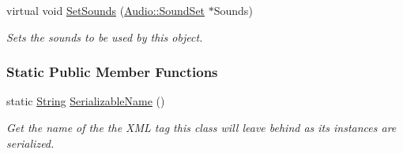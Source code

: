 \begin{DoxyCompactItemize}
virtual void \hyperlink{classMezzanine_1_1WorldObject_a0e117f3bb42577953439ad00e3a08cd3}{SetSounds} (\hyperlink{classMezzanine_1_1Audio_1_1SoundSet}{Audio::SoundSet} $\ast$Sounds)
\begin{DoxyCompactList}\small\item\em Sets the sounds to be used by this object. \item\end{DoxyCompactList}\end{DoxyCompactItemize}
\subsubsection*{Static Public Member Functions}
\begin{DoxyCompactItemize}
\item 
static \hyperlink{namespaceMezzanine_acf9fcc130e6ebf08e3d8491aebcf1c86}{String} \hyperlink{classMezzanine_1_1WorldObject_af092fc48b1bf9721435470acc069ddf0}{SerializableName} ()
\begin{DoxyCompactList}\small\item\em Get the name of the the XML tag this class will leave behind as its instances are serialized. \item\end{DoxyCompactList}\end{DoxyCompactItemize}
